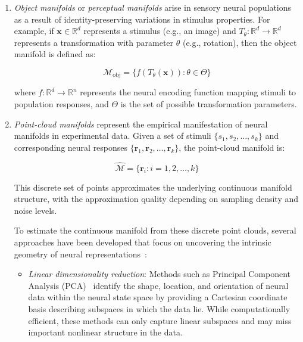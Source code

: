 \documentclass[11pt,a4paper]{article}
\begin{document}
\begin{enumerate}
    \item \textit{Object manifolds} or \textit{perceptual manifolds} arise in sensory neural populations as a result of identity-preserving variations in stimulus properties. For example, if $\mathbf{x} \in \mathbb{R}^d$ represents a stimulus (e.g., an image) and $T_\theta: \mathbb{R}^d \rightarrow \mathbb{R}^d$ represents a transformation with parameter $\theta$ (e.g., rotation), then the object manifold is defined as:
    
    \begin{equation}
    \mathcal{M}_{\text{obj}} = \{f(T_\theta(\mathbf{x})) : \theta \in \Theta\}
    \end{equation}
    
    where $f: \mathbb{R}^d \rightarrow \mathbb{R}^n$ represents the neural encoding function mapping stimuli to population responses, and $\Theta$ is the set of possible transformation parameters.
    
    \item \textit{Point-cloud manifolds} represent the empirical manifestation of neural manifolds in experimental data. Given a set of stimuli $\{s_1, s_2, \ldots, s_k\}$ and corresponding neural responses $\{\mathbf{r}_1, \mathbf{r}_2, \ldots, \mathbf{r}_k\}$, the point-cloud manifold is:
    
    \begin{equation}
    \hat{\mathcal{M}} = \{\mathbf{r}_i : i = 1, 2, \ldots, k\}
    \end{equation}
    
    This discrete set of points approximates the underlying continuous manifold structure, with the approximation quality depending on sampling density and noise levels.
    
    To estimate the continuous manifold from these discrete point clouds, several approaches have been developed that focus on uncovering the intrinsic geometry of neural representations~\cite{chung2021neural}:
    
    \begin{itemize}
        \item \textit{Linear dimensionality reduction}: Methods such as Principal Component Analysis (PCA)~\cite{cunningham2014dimensionality} identify the shape, location, and orientation of neural data within the neural state space by providing a Cartesian coordinate basis describing subspaces in which the data lie. While computationally efficient, these methods can only capture linear subspaces and may miss important nonlinear structure in the data.
        

\end{itemize}
\end{enumerate}
\end{document}
